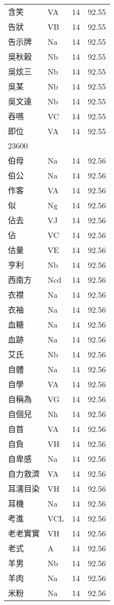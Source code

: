 \documentclass[twocolumn]{book}
\begin{document}
\begin{supertabular}{llrr}
含笑 & VA & 14 &  92.55\\
告狀 & VB & 14 &  92.55\\
告示牌 & Na & 14 &  92.55\\
吳秋榖 & Nb & 14 &  92.55\\
吳炫三 & Nb & 14 &  92.55\\
吳某 & Nb & 14 &  92.55\\
吳文達 & Nb & 14 &  92.55\\
吞嚥 & VC & 14 &  92.55\\
即位 & VA & 14 &  92.55\\
23600\\
伯母 & Na & 14 &  92.56\\
伯公 & Na & 14 &  92.56\\
作客 & VA & 14 &  92.56\\
似 & Ng & 14 &  92.56\\
佔去 & VJ & 14 &  92.56\\
佔 & VC & 14 &  92.56\\
估量 & VE & 14 &  92.56\\
亨利 & Nb & 14 &  92.56\\
西南方 & Ncd & 14 &  92.56\\
衣襟 & Na & 14 &  92.56\\
衣袖 & Na & 14 &  92.56\\
血糖 & Na & 14 &  92.56\\
血跡 & Na & 14 &  92.56\\
艾氏 & Nb & 14 &  92.56\\
自體 & Na & 14 &  92.56\\
自學 & VA & 14 &  92.56\\
自稱為 & VG & 14 &  92.56\\
自個兒 & Nh & 14 &  92.56\\
自首 & VA & 14 &  92.56\\
自負 & VH & 14 &  92.56\\
自卑感 & Na & 14 &  92.56\\
自力救濟 & VA & 14 &  92.56\\
耳濡目染 & VH & 14 &  92.56\\
耳機 & Na & 14 &  92.56\\
考進 & VCL & 14 &  92.56\\
老老實實 & VH & 14 &  92.56\\
老式 & A & 14 &  92.56\\
羊男 & Nb & 14 &  92.56\\
羊肉 & Na & 14 &  92.56\\
米粉 & Na & 14 &  92.56\\

\end{supertabular}
\end{document}
